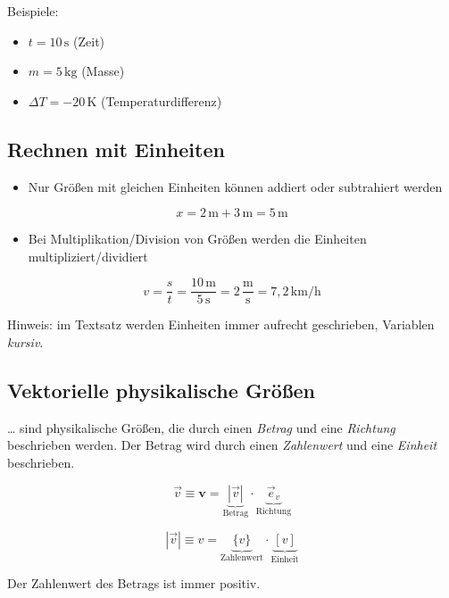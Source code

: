\documentclass[
  11pt,
]{article}
\providecommand{\tightlist}{%
  \setlength{\itemsep}{0pt}\setlength{\parskip}{0pt}}
\begin{document}
Beispiele:

\begin{itemize}
\tightlist
\item
  \(t = 10 \, \text{s}\) (Zeit)
\item
  \(m = 5 \, \text{kg}\) (Masse)
\item
  \(\Delta T = -20 \, \text{K}\) (Temperaturdifferenz)
\end{itemize}

\subsection{Rechnen mit Einheiten}\label{rechnen-mit-einheiten}

\begin{itemize}
\tightlist
\item
  Nur Größen mit gleichen Einheiten können addiert oder subtrahiert
  werden
\end{itemize}

\[x = 2 \, \text{m} + 3 \, \text{m} = 5 \, \text{m}\]

\begin{itemize}
\tightlist
\item
  Bei Multiplikation/Division von Größen werden die Einheiten
  multipliziert/dividiert
\end{itemize}

\[v = \frac{s}{t} = \frac{10 \, \text{m}}{5 \, \text{s}} = 2 \, \frac{\text{m}}{\text{s}} = 7{,}2 \, \text{km/h}\]

Hinweis: im Textsatz werden Einheiten immer aufrecht geschrieben,
Variablen \emph{kursiv}.

\subsection{Vektorielle physikalische
Größen}\label{vektorielle-physikalische-gruxf6uxdfen}

\ldots{} sind physikalische Größen, die durch einen \emph{Betrag} und
eine \emph{Richtung} beschrieben werden. Der Betrag wird durch einen
\emph{Zahlenwert} und eine \emph{Einheit} beschrieben.

\[\vec{v}\equiv \mathbf{v} = \underbrace{|\vec{v}|}_{\text{Betrag}} \cdot \underbrace{\vec{e}_v}_{\text{Richtung}}\]

\[ |\vec{v}| \equiv v = \underbrace{\lbrace v \rbrace}_{\text{Zahlenwert}} \cdot \underbrace{[v]}_{\text{Einheit}}\]

Der Zahlenwert des Betrags ist immer positiv.
\end{document}
